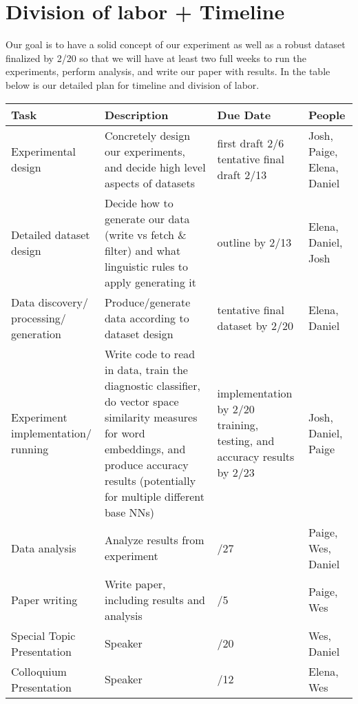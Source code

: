 \documentclass[11pt,a4paper]{article}
\begin{document}
\section{Division of labor + Timeline}
Our goal is to have a solid concept of our experiment as well as a robust dataset finalized by 2/20 so that we will have at least two full weeks to run the experiments, perform analysis, and write our paper with results. In the table below is our detailed plan for timeline and division of labor.
\clearpage
\begin{tabularx}{1.01\textwidth} { 
  | >{\raggedright\arraybackslash}X 
  | >{\centering\arraybackslash}X 
  | >{\centering\arraybackslash}X 
  | >{\raggedleft\arraybackslash}X | }
 \hline
 \textbf{Task} & \textbf{Description} & \textbf{Due Date}  & \textbf{People} \\
 \hline
 Experimental design  &  Concretely design our experiments, and decide high level aspects of datasets
 & {first draft 2/6 \newline
 tentative final draft 2/13} & Josh, Paige, Elena, Daniel \\
  \hline
 Detailed dataset design  & Decide how to generate our data (write vs fetch \newline \& filter) and what linguistic rules to apply generating 
 it
  & outline by 2/13 & Elena, Daniel, Josh \\
      \hline
 Data discovery\// processing\// generation  & Produce\//generate data according to dataset design
  & tentative final dataset by 2/20 & Elena, Daniel \\
  
      \hline
Experiment implementation\// running & Write code to read in data, train the diagnostic classifier, do vector space similarity measures for word embeddings, and produce accuracy results (potentially for multiple different base NNs)

  &  implementation by 2/20 \newline \newline
  training, testing, and accuracy results by 2/23 & Josh, Daniel, Paige \\
  
   \hline
 Data analysis & Analyze results from experiment
  &  2/27 & Paige, Wes, Daniel \\
    
   \hline
 Paper writing & Write paper, including results and analysis
  &  3/5 & Paige, Wes \\
   \hline
Special Topic Presentation & Speaker
  &  2/20 & Wes, Daniel \\
     \hline
Colloquium Presentation
 & Speaker
  &  3/12 & Elena, Wes \\
\hline
\end{tabularx}
\clearpage


\end{document}
